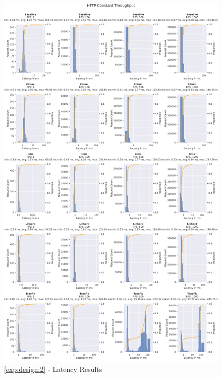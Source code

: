 \begin{figure}[!t]
    \centering
    
    \includegraphics[width=\textwidth,height=\textheight]{5_experimental_evaluation/figures/exp_02-latency-combined-results-offset.pdf}

    \caption{\ref{exp:design:2} - Latency Results}
    
    \label{fig:exp:result:02:latency}
\end{figure}

